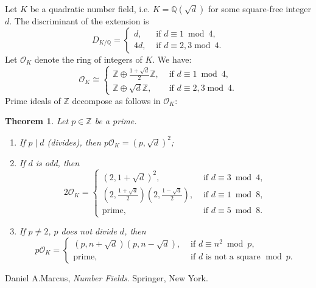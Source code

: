 \documentclass[12pt]{article}
\newtheorem{thm}{Theorem}
\newcommand{\Ints}{\mathbb{Z}}
\newcommand{\Rats}{\mathbb{Q}}
\begin{document}
Let $K$ be a quadratic number field, i.e. $K=\Rats(\sqrt{d})$ for
some square-free integer $d$. The discriminant of the extension is
\begin{equation*}
D_{K/\Rats}=\begin{cases} d, & \text{ if } d\equiv 1 \ \operatorname{mod}\ 4,\\
4d, & \text{ if } d\equiv 2,3 \operatorname{mod}\ 4.\end{cases}
\end{equation*}
Let $\mathcal{O}_K$ denote the ring of integers of $K$. We have:
\begin{equation*}\mathcal{O}_K\cong \begin{cases}
\Ints\oplus \frac{1+\sqrt{d}}{2}\Ints, & \text{ if } d\equiv 1 \ \operatorname{mod}\ 4,\\
\Ints\oplus \sqrt{d}\Ints, & \text{ if } d\equiv 2,3
\operatorname{mod}\ 4. \end{cases}
\end{equation*}
Prime ideals of $\Ints$ decompose as follows in $\mathcal{O}_K$:

\begin{thm} Let $p\in \Ints$ be a prime.
\begin{enumerate}
\item If $p\mid d$ (divides), then
$p\mathcal{O}_K=(p,\sqrt{d})^2$;

\item If $d$ is odd, then
\begin{equation*}2\mathcal{O}_K=\begin{cases}
(2,1+\sqrt{d})^2, & \text{ if } d\equiv 3\ \operatorname{mod}\ 4,\\
\left(2,\frac{1+\sqrt{d}}{2}\right)\left(2,\frac{1-\sqrt{d}}{2}\right), & \text{ if } d\equiv 1\ \operatorname{mod}\ 8,\\
\text{prime}, & \text{ if } d\equiv 5\ \operatorname{mod}\ 8.
\end{cases} \end{equation*}

\item If $p\neq 2$, $p$ does not divide $d$, then
\begin{equation*}
p\mathcal{O}_K=\begin{cases} (p,n+\sqrt{d})(p,n-\sqrt{d}), & \text{ if } d\equiv n^2\ \operatorname{mod}\ p,\\
\text{prime}, & \text{ if $d$ is not a square } \operatorname{mod}\ p.
\end{cases}
\end{equation*}
\end{enumerate}
\end{thm}

\begin{thebibliography}{9}
 Daniel A.Marcus, {\em Number Fields}. Springer, New York.
\end{thebibliography}
\end{document}
